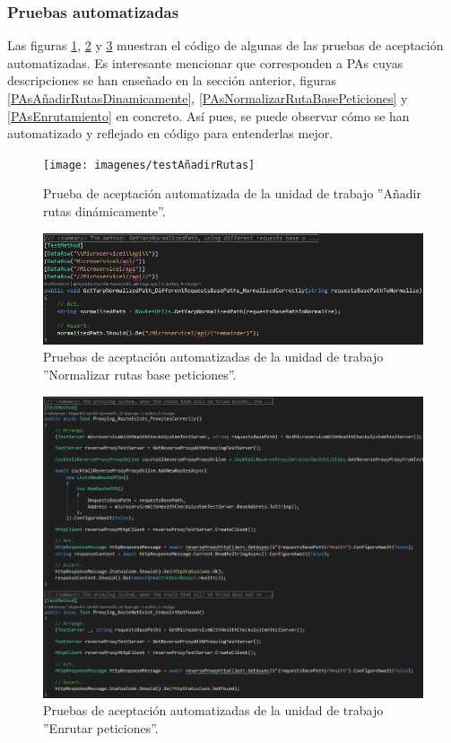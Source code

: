 \documentclass[11pt,spanish,listoffigures]{tfgetsinf}
\begin{document}

			\subsubsection{Pruebas automatizadas}

Las figuras \ref{testAñadirRutas}, \ref{testGetYarpNormalizedRequestsBasePath} y \ref{testsEnrutamiento} muestran el código de algunas de las pruebas de aceptación automatizadas. Es interesante mencionar que corresponden a PAs cuyas descripciones se han enseñado en la sección anterior, figuras \ref{PAsAñadirRutasDinamicamente}, \ref{PAsNormalizarRutaBasePeticiones} y \ref{PAsEnrutamiento} en concreto. Así pues, se puede observar cómo se han automatizado y reflejado en código para entenderlas mejor.

\begin{figure}[ht]
\centering
\texttt{[image: imagenes/testAñadirRutas]}
\caption{Prueba de aceptación automatizada de la unidad de trabajo ''Añadir rutas dinámicamente''.}
	\label{testAñadirRutas}
\end{figure}

\begin{figure}[ht]
\centering
\includegraphics[width=1\textwidth]{imagenes/testGetYarpNormalizedRequestsBasePath}
\caption{Pruebas de aceptación automatizadas de la unidad de trabajo ''Normalizar rutas base peticiones''.}
	\label{testGetYarpNormalizedRequestsBasePath}
\end{figure}

\begin{figure}[ht]
\centering
\includegraphics[width=1\textwidth]{imagenes/testsEnrutarPeticiones}
\caption{Pruebas de aceptación automatizadas de la unidad de trabajo ''Enrutar peticiones''.}
	\label{testsEnrutamiento}
\end{figure}
\end{document}
